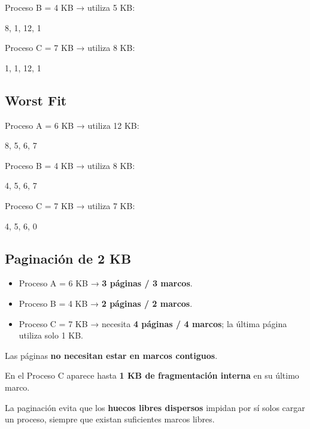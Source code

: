 \documentclass[
  spanish,
  letterpaper,
]{scrbook}
\newenvironment{Shaded}{\begin{snugshade}}{\end{snugshade}}
\newcommand{\NormalTok}[1]{\textcolor[rgb]{0.00,0.23,0.31}{#1}}
\providecommand{\tightlist}{%
  \setlength{\itemsep}{0pt}\setlength{\parskip}{0pt}}
\begin{document}
\begin{tcolorbox}
Proceso B = 4 KB → utiliza 5 KB:

\begin{Shaded}
\begin{Highlighting}[]
\NormalTok{8, 1, 12, 1}
\end{Highlighting}
\end{Shaded}

Proceso C = 7 KB → utiliza 8 KB:

\begin{Shaded}
\begin{Highlighting}[]
\NormalTok{1, 1, 12, 1}
\end{Highlighting}
\end{Shaded}

\subsection{Worst Fit}\label{worst-fit}

Proceso A = 6 KB → utiliza 12 KB:

\begin{Shaded}
\begin{Highlighting}[]
\NormalTok{8, 5, 6, 7}
\end{Highlighting}
\end{Shaded}

Proceso B = 4 KB → utiliza 8 KB:

\begin{Shaded}
\begin{Highlighting}[]
\NormalTok{4, 5, 6, 7}
\end{Highlighting}
\end{Shaded}

Proceso C = 7 KB → utiliza 7 KB:

\begin{Shaded}
\begin{Highlighting}[]
\NormalTok{4, 5, 6, 0}
\end{Highlighting}
\end{Shaded}

\subsection{Paginación de 2 KB}\label{paginaciuxf3n-de-2-kb}

\begin{itemize}
\tightlist
\item
  Proceso A = 6 KB → \textbf{3 páginas / 3 marcos}.
\item
  Proceso B = 4 KB → \textbf{2 páginas / 2 marcos}.
\item
  Proceso C = 7 KB → necesita \textbf{4 páginas / 4 marcos}; la última
  página utiliza solo 1 KB.
\end{itemize}

Las páginas \textbf{no necesitan estar en marcos contiguos}.

En el Proceso C aparece hasta \textbf{1 KB de fragmentación interna} en
su último marco.

La paginación evita que los \textbf{huecos libres dispersos} impidan por
sí solos cargar un proceso, siempre que existan suficientes marcos
libres.

\end{tcolorbox}
\end{document}
